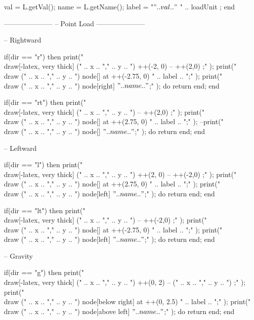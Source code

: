 \begin{luacode}
		val = L.getVal();
		name = L.getName();
		label = "$" .. val .. "$ " .. loadUnit ;
	end
	
	---------------------
	-- Point Load
	---------------------
	
	-- Rightward
	
	if(dir == "r") then
		print("\\draw[-latex, very thick] (" .. x .. "," .. y .. ") ++(-2, 0) -- ++(2,0) ;" );
		print("\\draw (" .. x .. "," .. y .. ") node[] at ++(-2.75, 0) {" .. label .. "};" );
		print("\\draw (" .. x .. "," .. y .. ") node[right] {$" .. name .. "$};" );
		do return end;
	end
	
	if(dir == "rt") then
		print("\\draw[-latex, very thick] (" .. x .. "," .. y .. ") -- ++(2,0) ;" );
		print("\\draw (" .. x .. "," .. y .. ") node[] at ++(2.75, 0) {" .. label .. "};" );
		--print("\\draw (" .. x .. "," .. y .. ") node[] {$" .. name .. "$};" );
		do return end;
	end
	
	-- Leftward
	
	if(dir == "l") then
		print("\\draw[-latex, very thick] (" .. x .. "," .. y .. ") ++(2, 0) -- ++(-2,0) ;" );
		print("\\draw (" .. x .. "," .. y .. ") node[] at ++(2.75, 0) {" .. label .. "};" );
		print("\\draw (" .. x .. "," .. y .. ") node[left] {$" .. name.. "$};" );
		do return end;
	end
	

	if(dir == "lt") then
		print("\\draw[-latex, very thick] (" .. x .. "," .. y .. ") -- ++(-2,0) ;" );
		print("\\draw (" .. x .. "," .. y .. ") node[] at ++(-2.75, 0) {" .. label .. "};" );
		print("\\draw (" .. x .. "," .. y .. ") node[left] {$" .. name.. "$};" );
		do return end;
	end
	
	-- Gravity
	
	if(dir == "g") then
		print("\\draw[-latex, very thick] (" .. x .. "," .. y .. ") ++(0, 2) -- (" .. x .. "," .. y .. ") ;" );
		print("\\draw (" .. x .. "," .. y .. ") node[below right] at ++(0, 2.5) {" .. label .. "};" );
		print("\\draw (" .. x .. "," .. y .. ") node[above left] {$" .. name .. "$};" );
		do return end;
	end
	

\end{luacode}

